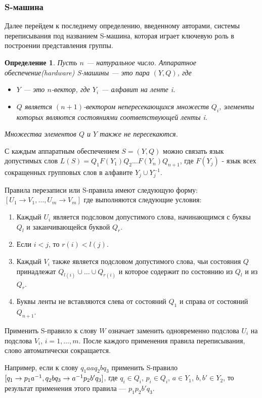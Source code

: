 \documentclass[14pt]{matmex-diploma-custom}
\newtheorem{defn}{Определение}[subsection]
\begin{document}
\subsubsection{S-машина}

Далее перейдем к последнему определению, введенному авторами, системы переписывания 
под названием S-машина, которая играет ключевую роль в построении представления группы.

\begin{defn}
Пусть $ n $ --- натуральное число.
Аппаратное обеспечение(hardware) S-машины --- это пара $ (Y, Q) $, где
\begin{itemize}
    \item $ Y $ --- это $ n $-вектор, где $ Y_i $ --- алфавит на ленте i.
    \item $ Q $ является $ (n + 1) $-вектором непересекающихся множеств $ Q_i $, элементы которых 
    являются состояниями соответствующей ленты i.
\end{itemize}
Множества элементов $ Q $ и $ Y $ также не пересекаются.
\end{defn}

С каждым аппаратным обеспечением $ S = (Y, Q) $ можно связать язык допустимых слов
$ L (S) = Q_1F(Y_1) Q_2 \dots F (Y_n) Q_{n + 1} $, где $ F (Y_j) $ - язык
всех сокращенных групповых слов в алфавите $ Y_j \cup Y_j^{-1} $.

Правила перезаписи или S-правила имеют следующую форму:
$ [U_1 \to V_1, \dots, U_m \to V_m] $
где выполняются следующие условия:
\begin{enumerate}
    \item Каждый $ U_i $ является подсловом допустимого слова, начинающимся с буквы $ Q_l $ и заканчивающейся буквой $ Q_r $.
    \item Если $i < j$, то $r(i) < l(j)$.
    \item Каждый $ V_i $ также является подсловом допустимого слова, чьи состояния $Q$ 
    принадлежат $ Q_{l(i)} \cup \dots \cup Q_{r(i)} $ и которое содержит по состоянию из $Q_l$ и из $Q_r$.
    \item Буквы ленты не вставляются слева от состояний $ Q_1 $ и справа от состояний $ Q_{n + 1} $.
\end{enumerate}

Применить S-правило к слову $ W $ означает заменить одновременно
подслова $ U_i $ на подслова $ V_i $, $ i = 1, \dots, m $. 
После каждого применения правила переписывания, слово автоматически сокращается.

Например, если к слову $ q_1 a a q_2 b q_3 $ применить S-правило
$\newline
[q_1 \to p_1 a^{-1}, q_2 b q_3 \to a^{-1} p_2 b' q_3]$,
где $q_i \in Q_i$, $p_i \in Q_i$, $a \in Y_1$, $b, b' \in Y_2$, то результат
применения этого правила --- $ p_1 p_2 b' q_3 $.
\end{document}
